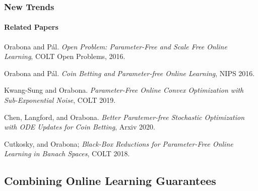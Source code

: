 \documentclass{beamer}
\begin{document}
\begin{frame}
\frametitle{New Trends}
\framesubtitle{Related Papers}
\begin{small}
\begin{itemize}

{\small
\item Orabona and P\'{a}l. \textit{Open Problem: Parameter-Free and Scale Free Online Learning}, COLT Open Problems, 2016.

\item Orabona and P\'{a}l.  \textit{Coin Betting and Parameter-free Online Learning}, NIPS 2016.

\item Kwang-Sung and Orabona.
\textit{Parameter-Free Online Convex Optimization with Sub-Exponential Noise}, COLT 2019.


\item Chen, Langford, and Orabona. \textit{Better Paratemer-free Stochastic Optimization with ODE Updates for Coin Betting}, Arxiv 2020.


\item Cutkosky, and Orabona; \textit{Black-Box Reductions for Parameter-Free Online Learning in Banach Spaces}, COLT 2018.

}
\end{itemize}
\end{small}

\end{frame}

\subsection{Combining Online Learning Guarantees}
\frame{\subsectionpage}
\end{document}
